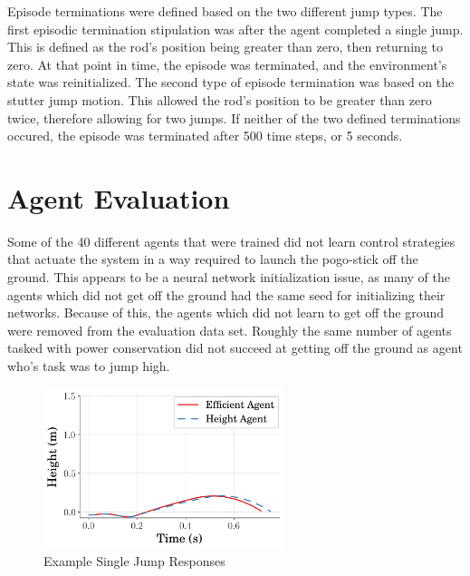 \documentclass{ifacconf}
\begin{document}
      
      Episode terminations were defined based on the two different jump types. The first episodic termination stipulation was after the agent completed a single jump. This is defined as the rod's position being greater than zero, then returning to zero. At that point in time, the episode was terminated, and the environment's state was reinitialized. The second type of episode termination was based on the stutter jump motion. This allowed the rod's position to be greater than zero twice, therefore allowing for two jumps. If neither of the two defined terminations occured, the episode was terminated after 500 time steps, or 5 seconds.


\section{Agent Evaluation}
   Some of the 40 different agents that were trained did not learn control strategies that actuate the system in a way required to launch the pogo-stick off the ground. This appears to be a neural network initialization issue, as many of the agents which did not get off the ground had the same seed for initializing their networks. Because of this, the agents which did not learn to get off the ground were removed from the evaluation data set. Roughly the same number of agents tasked with power conservation did not succeed at getting off the ground as agent who's task was to jump high.
   
   \begin{figure}[t]
      \begin{center}
         \includegraphics[width=7cm]{figures/timeseries/PositionVsTime_OneJump.png}    %
         \caption{Example Single Jump Responses} 
         \label{fig:oneJumpPosition}
      \end{center}
   \end{figure}
   
\end{document}
